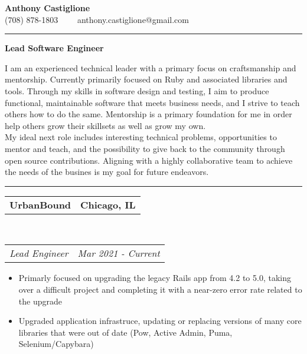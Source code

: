 \documentclass[10pt,letterpaper]{article}
\makeatletter
\newcommand{\headerrow}[2]
{\begin{tabular*}{\linewidth}{l@{\extracolsep{\fill}}r}
  #1 &
  #2 \\
\end{tabular*}}
\newenvironment{indentsection}[1]%
{\begin{list}{}%
  {\setlength{\leftmargin}{#1}}%
  \item[]%
}
{\end{list}}
\makeatother
\begin{document}
\begin{center}
  {\LARGE \textbf {Anthony Castiglione}} \\ (708) 878-1803 \ \ \textbullet \ \ anthony.castiglione@gmail.com
\end{center}
\hrule
\begin{center}
  {\Large \textbf {Lead Software Engineer}}
\end{center}
\par I am an experienced technical leader with a primary focus on craftsmanship and mentorship. Currently primarily focused on Ruby and associated libraries and tools. Through my skills in software design and testing, I aim to produce functional, maintainable software that meets business needs, and I strive to teach others how to do the same. Mentorship is a primary foundation for me in order help others grow their skillsets as well as grow my own.
\noindent \mbox{}\\

My ideal next role includes interesting technical problems, opportunities to mentor and teach, and the possibility to give back to the community through open source contributions. Aligning with a highly collaborative team to achieve the needs of the busines is my goal for future endeavors.

\vspace{0.2in}
\hrule
\vspace{0.2in}


\begin{indentsection}{\parindent}
  \headerrow
    {\textbf{UrbanBound} }
    {\textbf{Chicago, IL}}
  \\
  \headerrow
    {\emph{Lead Engineer}}
    {\emph{Mar 2021 - Current}}

  \begin{itemize}
  \renewcommand{\labelitemi}{$-$}
  \vspace{-0.1in}
    \item Primarly focused on upgrading the legacy Rails app from 4.2 to 5.0, taking over a difficult project and completing it with a near-zero error rate related to the upgrade
    \item Upgraded application infrastruce, updating or replacing versions of many core libraries that were out of date (Pow, Active Admin, Puma, Selenium/Capybara)
  \end{itemize}
\end{indentsection}
\end{document}
